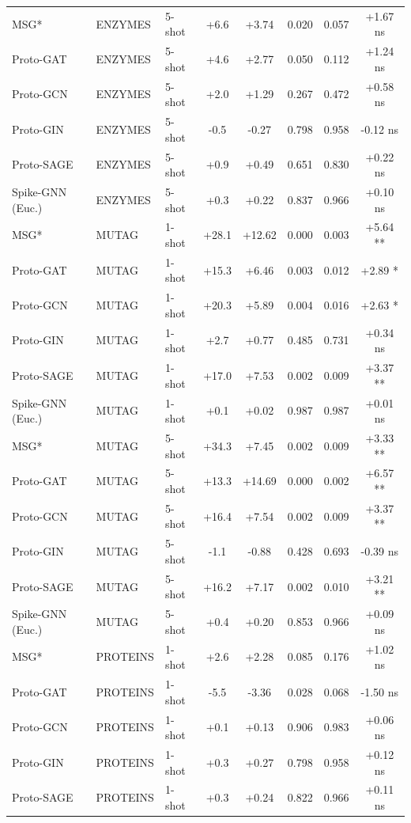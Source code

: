 \begin{table}[htbp]
\begin{tabular*}{\tblwidth}{@{} LLLccccc @{}}
MSG* & ENZYMES & 5-shot & +6.6 & +3.74 & 0.020 & 0.057 & +1.67 ns \\
Proto-GAT & ENZYMES & 5-shot & +4.6 & +2.77 & 0.050 & 0.112 & +1.24 ns \\
Proto-GCN & ENZYMES & 5-shot & +2.0 & +1.29 & 0.267 & 0.472 & +0.58 ns \\
Proto-GIN & ENZYMES & 5-shot & -0.5 & -0.27 & 0.798 & 0.958 & -0.12 ns \\
Proto-SAGE & ENZYMES & 5-shot & +0.9 & +0.49 & 0.651 & 0.830 & +0.22 ns \\
Spike-GNN (Euc.) & ENZYMES & 5-shot & +0.3 & +0.22 & 0.837 & 0.966 & +0.10 ns \\
MSG* & MUTAG & 1-shot & +28.1 & +12.62 & 0.000 & 0.003 & +5.64 ** \\
Proto-GAT & MUTAG & 1-shot & +15.3 & +6.46 & 0.003 & 0.012 & +2.89 * \\
Proto-GCN & MUTAG & 1-shot & +20.3 & +5.89 & 0.004 & 0.016 & +2.63 * \\
Proto-GIN & MUTAG & 1-shot & +2.7 & +0.77 & 0.485 & 0.731 & +0.34 ns \\
Proto-SAGE & MUTAG & 1-shot & +17.0 & +7.53 & 0.002 & 0.009 & +3.37 ** \\
Spike-GNN (Euc.) & MUTAG & 1-shot & +0.1 & +0.02 & 0.987 & 0.987 & +0.01 ns \\
MSG* & MUTAG & 5-shot & +34.3 & +7.45 & 0.002 & 0.009 & +3.33 ** \\
Proto-GAT & MUTAG & 5-shot & +13.3 & +14.69 & 0.000 & 0.002 & +6.57 ** \\
Proto-GCN & MUTAG & 5-shot & +16.4 & +7.54 & 0.002 & 0.009 & +3.37 ** \\
Proto-GIN & MUTAG & 5-shot & -1.1 & -0.88 & 0.428 & 0.693 & -0.39 ns \\
Proto-SAGE & MUTAG & 5-shot & +16.2 & +7.17 & 0.002 & 0.010 & +3.21 ** \\
Spike-GNN (Euc.) & MUTAG & 5-shot & +0.4 & +0.20 & 0.853 & 0.966 & +0.09 ns \\
MSG* & PROTEINS & 1-shot & +2.6 & +2.28 & 0.085 & 0.176 & +1.02 ns \\
Proto-GAT & PROTEINS & 1-shot & -5.5 & -3.36 & 0.028 & 0.068 & -1.50 ns \\
Proto-GCN & PROTEINS & 1-shot & +0.1 & +0.13 & 0.906 & 0.983 & +0.06 ns \\
Proto-GIN & PROTEINS & 1-shot & +0.3 & +0.27 & 0.798 & 0.958 & +0.12 ns \\
Proto-SAGE & PROTEINS & 1-shot & +0.3 & +0.24 & 0.822 & 0.966 & +0.11 ns \\

\end{tabular*}
\end{table}
